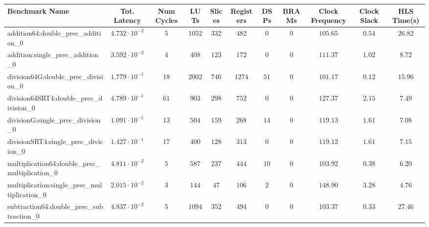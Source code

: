 \begin{tabular}{|l|c|c|c|c|c|c|c|c|c|c|}
\hline
Benchmark Name                                   & Tot. Latency            & Num Cycles & LUTs     & Slices   & Registers & DSPs   & BRAMs & Clock Frequency & Clock Slack & HLS Time(s) \\
\hline
addition64:double\_prec\_addition\_0             & $ 4.732 \cdot 10^{-2} $ & $ 5      $ & $ 1052 $ & $ 332  $ & $ 482   $ & $ 0  $ & $ 0 $ & $ 105.65      $ & $ 0.54    $ & $ 26.82   $ \\
addition:single\_prec\_addition\_0               & $ 3.592 \cdot 10^{-2} $ & $ 4      $ & $ 408  $ & $ 123  $ & $ 172   $ & $ 0  $ & $ 0 $ & $ 111.37      $ & $ 1.02    $ & $ 8.72    $ \\
division64G:double\_prec\_division\_0            & $ 1.779 \cdot 10^{-1} $ & $ 18     $ & $ 2002 $ & $ 746  $ & $ 1274  $ & $ 51 $ & $ 0 $ & $ 101.17      $ & $ 0.12    $ & $ 15.96   $ \\
division64SRT4:double\_prec\_division\_0         & $ 4.789 \cdot 10^{-1} $ & $ 61     $ & $ 903  $ & $ 298  $ & $ 752   $ & $ 0  $ & $ 0 $ & $ 127.37      $ & $ 2.15    $ & $ 7.49    $ \\
divisionG:single\_prec\_division\_0              & $ 1.091 \cdot 10^{-1} $ & $ 13     $ & $ 504  $ & $ 159  $ & $ 268   $ & $ 14 $ & $ 0 $ & $ 119.13      $ & $ 1.61    $ & $ 7.08    $ \\
divisionSRT4:single\_prec\_division\_0           & $ 1.427 \cdot 10^{-1} $ & $ 17     $ & $ 400  $ & $ 128  $ & $ 313   $ & $ 0  $ & $ 0 $ & $ 119.12      $ & $ 1.61    $ & $ 7.15    $ \\
multiplication64:double\_prec\_multiplication\_0 & $ 4.811 \cdot 10^{-2} $ & $ 5      $ & $ 587  $ & $ 237  $ & $ 444   $ & $ 10 $ & $ 0 $ & $ 103.92      $ & $ 0.38    $ & $ 6.20    $ \\
multiplication:single\_prec\_multiplication\_0   & $ 2.015 \cdot 10^{-2} $ & $ 3      $ & $ 144  $ & $ 47   $ & $ 106   $ & $ 2  $ & $ 0 $ & $ 148.90      $ & $ 3.28    $ & $ 4.76    $ \\
subtraction64:double\_prec\_subtraction\_0       & $ 4.837 \cdot 10^{-2} $ & $ 5      $ & $ 1094 $ & $ 352  $ & $ 494   $ & $ 0  $ & $ 0 $ & $ 103.37      $ & $ 0.33    $ & $ 27.46   $ \\

\end{tabular}
